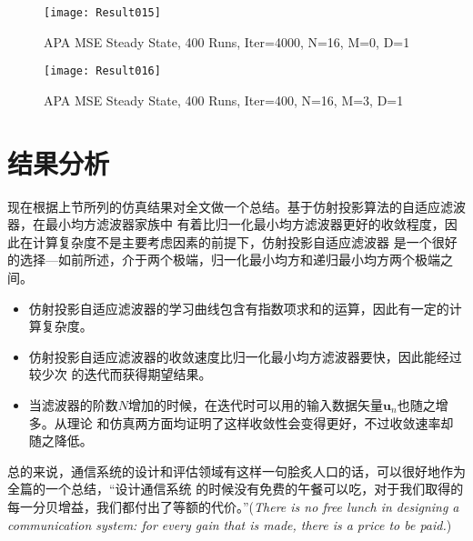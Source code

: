 \begin{figure}[htbp]
  \texttt{[image: Result015]}\\
  \caption{APA MSE Steady State, 400 Runs, Iter=4000, N=16, M=0, D=1}\label{APAMSE015}
\end{figure}

\begin{figure}[htbp]
  \texttt{[image: Result016]}\\
  \caption{APA MSE Steady State, 400 Runs, Iter=400, N=16, M=3, D=1}\label{APAMSE016}
\end{figure}
\section{结果分析}
现在根据上节所列的仿真结果对全文做一个总结。基于仿射投影算法的自适应滤波器，在最小均方滤波器家族中
有着比归一化最小均方滤波器更好的收敛程度，因此在计算复杂度不是主要考虑因素的前提下，仿射投影自适应滤波器
是一个很好的选择---如前所述，介于两个极端，归一化最小均方和递归最小均方两个极端之间。
\begin{itemize}
  \item 仿射投影自适应滤波器的学习曲线包含有指数项求和的运算，因此有一定的计算复杂度。
  \item 仿射投影自适应滤波器的收敛速度比归一化最小均方滤波器要快，因此能经过较少次
  的迭代而获得期望结果。
  \item 当滤波器的阶数$N$增加的时候，在迭代时可以用的输入数据矢量$\mathbf{u}_{n}$也随之增多。从理论
  和仿真两方面均证明了这样收敛性会变得更好，不过收敛速率却随之降低。
\end{itemize}
总的来说，通信系统的设计和评估领域有这样一句脍炙人口的话，可以很好地作为全篇的一个总结，“设计通信系统
的时候没有免费的午餐可以吃，对于我们取得的每一分贝增益，我们都付出了等额的代价。”(\emph{There is no
free lunch in designing a communication system: for every gain that is made, there is a price to be
paid.})




